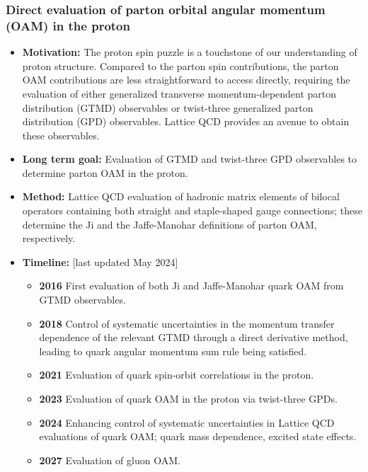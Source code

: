 \documentclass[12pt,hyperpdf]{article}
\begin{document}
\subsubsection{Direct evaluation of parton orbital angular momentum (OAM) in
the proton}
\begin{itemize}
\item{\bf Motivation:} The proton spin puzzle is a touchstone of our
understanding of proton structure. Compared to the parton spin
contributions, the parton OAM contributions are less straightforward
to access directly, requiring the evaluation of either generalized
transverse momentum-dependent parton distribution (GTMD) observables
or twist-three generalized parton distribution (GPD) observables.
Lattice QCD provides an avenue to obtain these observables.
\item{\bf Long term goal:} Evaluation of GTMD and twist-three GPD observables
to determine parton OAM in the proton.
\item{\bf Method:} Lattice QCD evaluation of hadronic matrix elements of
bilocal operators containing both straight and staple-shaped gauge
connections; these determine the Ji and the Jaffe-Manohar definitions
of parton OAM, respectively.
\item{\bf Timeline:} \hfill [last updated May 2024]
\begin{itemize}
\item{\bf 2016} First evaluation of both Ji and Jaffe-Manohar quark OAM from
GTMD observables.
\item{\bf 2018} Control of systematic uncertainties in the momentum transfer
dependence of the relevant GTMD through a direct derivative method,
leading to quark angular momentum sum rule being satisfied.
\item{\bf 2021} Evaluation of quark spin-orbit correlations in the proton.
\item{\bf 2023} Evaluation of quark OAM in the proton via twist-three GPDs.
\item{\bf 2024} Enhancing control of systematic uncertainties in Lattice QCD
evaluations of quark OAM; quark mass dependence, excited state effects.
\item{\bf 2027} Evaluation of gluon OAM.
\end{itemize}
\end{itemize}



\end{document}
